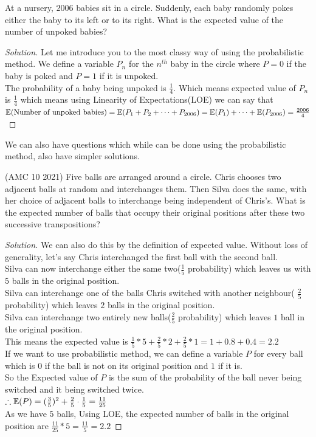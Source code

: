 \begin{example}
[HMMT 2006] At a nursery, $2006$ babies sit in a circle. Suddenly, each baby randomly pokes either the baby to its left or to its right. What is the expected value of the number of unpoked babies?
\end{example}
\begin{proof}
    [Solution]
Let me introduce you to the most classy way of using the probabilistic method. We define a variable $P_n$ for the $n^{th}$ baby in the circle where $P=0$ if the baby is poked and $P=1$ if it is unpoked.\\
The probability of a baby being unpoked is $\frac{1}{4}$. Which means expected value of $P_n$ is $\frac{1}{4}$ which means using Linearity of Expectations(LOE) we can say that $\mathbb{E}({\text{Number of unpoked babies}})=\mathbb{E}({P_1+P_2+\dots+P_{2006}})=\mathbb{E}({P_1})+\dots+\mathbb{E}({P_{2006}})=\frac{2006}{4}$\\
\end{proof}
We can also have questions which while can be done using the probabilistic method, also have simpler solutions.
\begin{example}
(AMC 10 2021) Five balls are arranged around a circle. Chris chooses two adjacent balls at random and interchanges them. Then Silva does the same, with her choice of adjacent balls to interchange being independent of Chris’s. What is the expected number of balls that occupy their original positions after these two successive transpositions?
\end{example}
\begin{proof}
    [Solution]
We can also do this by the definition of expected value. Without loss of generality, let's say Chris interchanged the first ball with the second ball.\\
Silva can now interchange either the same two($\frac{1}{5}$ probability) which leaves us with $5$ balls in the original position.\\
Silva can interchange one of the balls Chris switched with another neighbour( $\frac{2}{5}$ probability) which leaves $2$ balls in the original position.\\
Silva can interchange two entirely new balls($\frac{2}{5}$ probability) which leaves $1$ ball in the original position.\\
This means the expected value is $\frac{1}{5}*5+\frac{2}{5}*2+\frac{2}{5}*1=1+0.8+0.4=2.2$\\
If we want to use probabilistic method, we can define a variable $P$ for every ball which is $0$ if the ball is not on its original position and $1$ if it is.\\
So the Expected value of $P$ is the sum of the probability of the ball never being switched and it being switched twice.\\
$\therefore \mathbb{E}({P})=(\frac{3}{5})^2+\frac{2}{5}\cdot\frac{1}{5}=\frac{11}{25}$\\
As we have $5$ balls, Using LOE, the expected number of balls in the original position are $\frac{11}{25}*5=\frac{11}{5}=2.2$
\end{proof}
